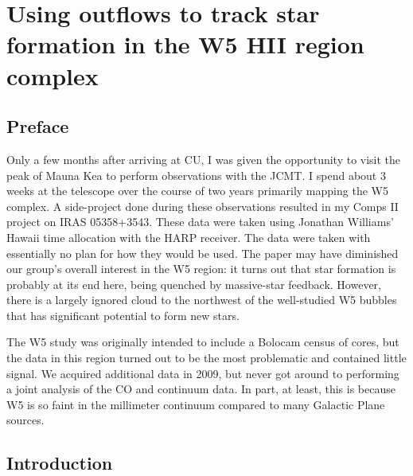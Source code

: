 
\chapter{Using outflows to track star formation in the W5 HII region complex}
\label{ch:w5}
\section{Preface}
Only a few months after arriving at CU, I was given the opportunity to visit
the peak of Mauna Kea to perform observations with the JCMT.  I spend about 3
weeks at the telescope over the course of two years primarily mapping the W5
complex.  A side-project done during these observations resulted in my Comps II
project on IRAS 05358+3543.  These data were taken using Jonathan Williams'
Hawaii time allocation with the HARP receiver.  The data were taken with
essentially no plan for how they would be used.  The paper may have diminished
our group's overall interest in the W5 region: it turns out that star formation
is probably at its end here, being quenched by massive-star feedback.  However,
there is a largely ignored cloud to the northwest of the well-studied W5 bubbles
that has significant potential to form new stars.  

The W5 study was originally intended to include a Bolocam census of cores, but
the data in this region turned out to be the most problematic and contained
little signal.  We acquired additional data in 2009, but never got around to
performing a joint analysis of the CO and continuum data.  In part, at least,
this is because W5 is so faint in the millimeter continuum compared to many
Galactic Plane sources.




\section{Introduction}


